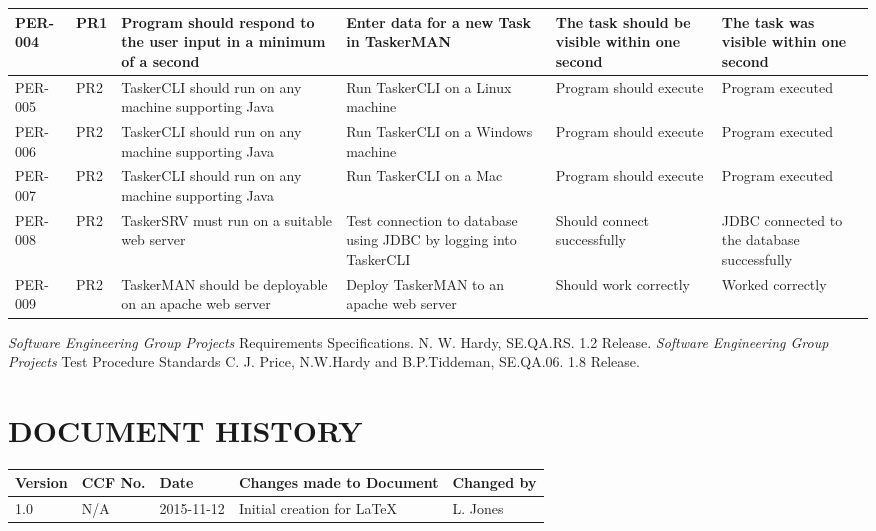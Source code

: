 \documentclass{project}
\begin{document}
\begin{longtable}{| p{1.8cm} | p{1.1cm} | p{2.8cm} | p{3.2cm} | p{3.2cm} | p{2.8cm} |}
\hline
PER-004 & PR1 & Program should respond to the user input in a minimum of a second & Enter data for a new Task in TaskerMAN & The task should be visible within one second & The task was visible within one second \\
\hline
PER-005 & PR2 & TaskerCLI should run on any machine supporting Java & Run TaskerCLI on a Linux machine & Program should execute & Program executed \\
\hline
PER-006 & PR2 & TaskerCLI should run on any machine supporting Java & Run TaskerCLI on a Windows machine & Program should execute & Program executed \\
\hline
PER-007 & PR2 & TaskerCLI should run on any machine supporting Java & Run TaskerCLI on a Mac & Program should execute & Program executed \\
\hline
PER-008 & PR2 & TaskerSRV must run on a suitable web server & Test connection to database using JDBC by logging into TaskerCLI & Should connect successfully & JDBC connected to the database successfully \\
\hline
PER-009 & PR2 & TaskerMAN should be deployable on an apache web server & Deploy TaskerMAN to an apache web server & Should work correctly & Worked correctly \\
\hline
\end{longtable}
\clearpage
{}
\begin{thebibliography}{2}
 \emph{Software Engineering Group Projects}
Requirements Specifications.
N. W. Hardy, SE.QA.RS. 1.2 Release.
 \emph{Software Engineering Group Projects}
Test Procedure Standards
C. J. Price, N.W.Hardy and B.P.Tiddeman, SE.QA.06. 1.8 Release.
\end{thebibliography}
\section*{DOCUMENT HISTORY}
\begin{tabular}{|l | l | l | p{8cm} |l | }
\hline
Version & CCF No. & Date & Changes made to Document & Changed by \\
\hline
1.0 & N/A & 2015-11-12 & Initial creation for LaTeX & L. Jones \\
\hline
\end{tabular}
\label{thelastpage}
\end{document}
